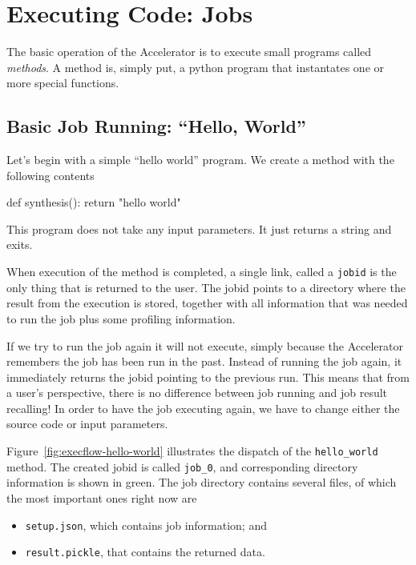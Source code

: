 \documentclass[a4paper]{article}
\begin{document}
\clearpage
\section{Executing Code: Jobs}
The basic operation of the Accelerator is to execute small programs
called \textsl{methods}.  A method is, simply put, a python program
that instantates one or more special functions.



\subsection{Basic Job Running:  ``Hello, World''}

Let's begin with a simple ``hello world'' program.  We create a method
with the following contents
\begin{python}
def synthesis():
    return "hello world"
\end{python}
This program does not take any input parameters.  It just returns a
string and exits.

When execution of the method is completed, a single link, called a
\texttt{jobid} is the only thing that is returned to the user.  The
jobid points to a directory where the result from the execution is
stored, together with all information that was needed to run the job
plus some profiling information.

If we try to run the job again it will not execute, simply because the
Accelerator remembers the job has been run in the past.  Instead of
running the job again, it immediately returns the jobid pointing to
the previous run.  This means that from a user's perspective, there is
no difference between job running and job result recalling!  In order
to have the job executing again, we have to change either the source
code or input parameters.

Figure~\ref{fig:execflow-hello-world} illustrates the dispatch of the
\texttt{hello\_world} method.  The created jobid is called
\texttt{job\_0}, and corresponding directory information is shown in
green.  The job directory contains several files, of which the most
important ones right now are
\begin{itemize}
  \item[] \texttt{setup.json}, which contains job information; and
  \item[] \texttt{result.pickle}, that contains the returned data.
\end{itemize}
\end{document}
